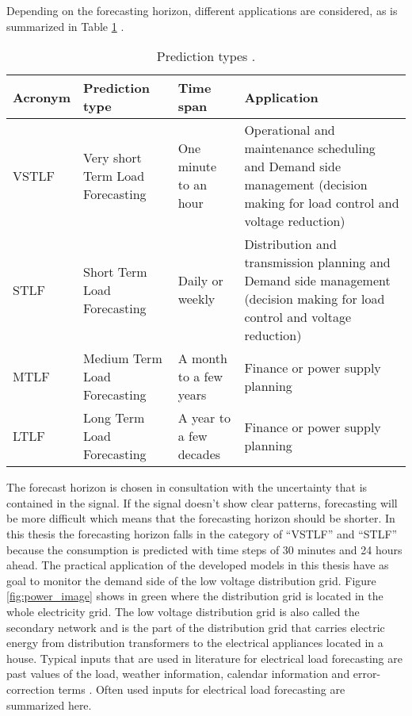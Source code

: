 Depending on the forecasting horizon, different applications are considered, as is summarized in Table \ref{tab:prediciontypes} \cite{NarjesFallah2018}.

\begin{table}[h!]
	\centering
	\begin{tabular}{@{}lp{3cm}p{3cm}p{4.5cm}@{}} \toprule
		\textbf{Acronym}	& \textbf{Prediction type} & \textbf{Time span} & \textbf{Application}\\\midrule
		VSTLF	& Very short Term Load Forecasting	& One minute to an hour	& Operational and maintenance
		scheduling and Demand side management
		(decision making for load
		control and voltage reduction)\\\hline		
		STLF	&	Short Term Load Forecasting 	& 	Daily or weekly		& Distribution and transmission
		planning and Demand side management
		(decision making for load
		control and voltage reduction)\\\hline	
		MTLF	&	Medium Term Load Forecasting	& A month to a few years	& Finance or power supply planning\\\hline
		LTLF	&	Long Term Load Forecasting	&	A year to a few decades	&	Finance or power supply planning\\\bottomrule
	\end{tabular}
	\caption{Prediction types \cite{NarjesFallah2018}.}
	\label{tab:prediciontypes}
\end{table}

The forecast horizon is chosen in consultation with the uncertainty that is contained in the signal. If the signal doesn't show clear patterns, forecasting will be more difficult which means that the forecasting horizon should be shorter. In this thesis the forecasting horizon falls in the category of ``VSTLF'' and ``STLF'' because the consumption is predicted with time steps of 30 minutes and 24 hours ahead. The practical application of the developed models in this thesis have as goal to monitor the demand side of the low voltage distribution grid. Figure \ref{fig:power_image} shows in green where the distribution grid is located in the whole electricity grid. The low voltage distribution grid is also called the secondary network and is the part of the distribution grid that carries electric energy from distribution transformers to the electrical appliances located in a house. Typical inputs that are used in literature for electrical load forecasting are past values of the load, weather information, calendar information and error-correction terms \cite{loadforecastingmoor}. Often used inputs for electrical load forecasting are summarized here.

